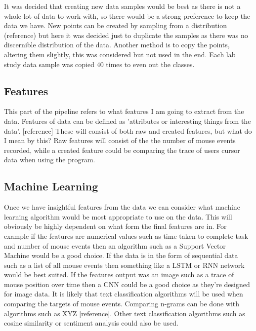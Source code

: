 \documentclass{article}
\begin{document}
It was decided that creating new data samples would be best as there is not a whole lot of data to work with, so there would be a strong preference to keep the data we have.
New points can be created by sampling from a distribution (reference) but here it was decided just to duplicate the samples as there was no discernible distribution of the data.
Another method is to copy the points, altering them slightly, this was considered but not used in the end.
Each lab study data sample was copied 40 times to even out the classes.

\subsection{Features}




This part of the pipeline refers to what features I am going to extract from the data.
Features of data can be defined as 'attributes or interesting things from the data'. [reference]
These will consist of both raw and created features, but what do I mean by this?
Raw features will consist of the the number of mouse events recorded, while a created feature could be comparing the trace of users cursor data when using the program.

\subsection{Machine Learning}


Once we have insightful features from the data we can consider what machine learning algorithm would be most appropriate to use on the data.
This will obviously be highly dependent on what form the final features are in.
For example if the features are numerical values such as time taken to complete task and number of mouse events then an algorithm such as a Support Vector Machine would be a good choice.
If the data is in the form of sequential data such as a list of all mouse events then something like a LSTM or RNN network would be best suited.
If the features output was an image such as a trace of mouse position over time then a CNN could be a good choice as they're designed for image data.
It is likely that text classification algorithms will be used when comparing the targets of mouse events.
Comparing n-grams can be done with algorithms such as XYZ [reference].
Other text classification algorithms such as cosine similarity or sentiment analysis could also be used.
\end{document}
